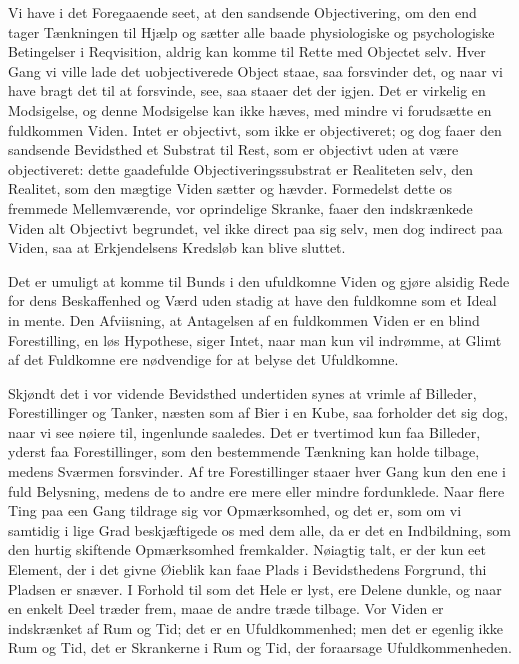 \documentclass[12pt]{book}
\newcommand{\apage}[1]{\marginnote{\footnotesize\textit{[#1]}}}
\begin{document}
Vi have i det Foregaaende seet, at den sandsende Objectivering, om den end
tager Tænkningen til Hjælp og sætter alle baade physiologiske og
psychologiske Betingelser i Reqvisition, aldrig kan komme til Rette med
Objectet selv. Hver Gang vi ville lade det uobjectiverede Object staae, saa
forsvinder det, og naar vi have bragt det til at forsvinde, see, saa staaer
det der igjen. Det er virkelig en Modsigelse, og denne Modsigelse kan ikke
hæves, med mindre vi forudsætte en fuldkommen Viden. Intet er objectivt,
som ikke er \apage{62} objectiveret; og dog faaer den sandsende Bevidsthed et Substrat
til Rest, som er objectivt uden at være objectiveret: dette gaadefulde
Objectiveringssubstrat er Realiteten selv, den Realitet, som den mægtige
Viden sætter og hævder. Formedelst dette os fremmede Mellemværende, vor
oprindelige Skranke, faaer den indskrænkede Viden alt Objectivt begrundet,
vel ikke direct paa sig selv, men dog indirect paa Viden, saa at
Erkjendelsens Kredsløb kan blive sluttet.

Det er umuligt at komme til Bunds i den ufuldkomne Viden og gjøre alsidig
Rede for dens Beskaffenhed og Værd uden stadig at have den fuldkomne som et
Ideal in mente. Den Afviisning, at Antagelsen af en fuldkommen
Viden er en blind Forestilling, en løs Hypothese, siger Intet, naar man kun
vil indrømme, at Glimt af det Fuldkomne ere nødvendige for at belyse det
Ufuldkomne.

Skjøndt det i vor vidende Bevidsthed undertiden synes at vrimle af
Billeder, Forestillinger og Tanker, næsten som af Bier i en Kube, saa
forholder det sig dog, naar vi see nøiere til, ingenlunde saaledes. Det er
tvertimod kun faa Billeder, yderst faa Forestillinger, som den bestemmende
Tænkning kan holde tilbage, medens Sværmen forsvinder. Af tre
Forestillinger staaer hver Gang kun den ene i fuld Belysning, medens de to
andre ere mere eller mindre fordunklede. Naar flere Ting paa een Gang
tildrage sig vor Opmærksomhed, og det er, som om vi samtidig i lige Grad
beskjæftigede os med dem alle, da er det en Indbildning, som den hurtig
skiftende Opmærksomhed fremkalder.  \apage{63} Nøiagtig talt, er der kun eet Element,
der i det givne Øieblik kan faae Plads i Bevidsthedens Forgrund, thi
Pladsen er snæver. I Forhold til som det Hele er lyst, ere Delene dunkle,
og naar en enkelt Deel træder frem, maae de andre træde tilbage. Vor Viden
er indskrænket af Rum og Tid; det er en Ufuldkommenhed; men det er egenlig
ikke Rum og Tid, det er Skrankerne i Rum og Tid, der foraarsage
Ufuldkommenheden.
\end{document}

